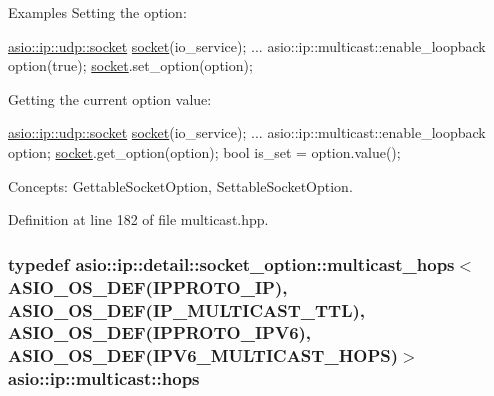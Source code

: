 \begin{DoxyParagraph}{Examples}
Setting the option\+: 
\begin{DoxyCode}
\hyperlink{classasio_1_1basic__datagram__socket}{asio::ip::udp::socket} \hyperlink{namespacewebsocketpp_1_1transport_1_1asio_1_1socket_1_1error_a828ddaa5ed63a761e1b557465a35f05aa0c31b356014843e1d09514e794a539a7}{socket}(io\_service); 
...
asio::ip::multicast::enable\_loopback option(\textcolor{keyword}{true});
\hyperlink{namespacewebsocketpp_1_1transport_1_1asio_1_1socket_1_1error_a828ddaa5ed63a761e1b557465a35f05aa0c31b356014843e1d09514e794a539a7}{socket}.set\_option(option);
\end{DoxyCode}

\end{DoxyParagraph}
\begin{DoxyParagraph}{}
Getting the current option value\+: 
\begin{DoxyCode}
\hyperlink{classasio_1_1basic__datagram__socket}{asio::ip::udp::socket} \hyperlink{namespacewebsocketpp_1_1transport_1_1asio_1_1socket_1_1error_a828ddaa5ed63a761e1b557465a35f05aa0c31b356014843e1d09514e794a539a7}{socket}(io\_service); 
...
asio::ip::multicast::enable\_loopback option;
\hyperlink{namespacewebsocketpp_1_1transport_1_1asio_1_1socket_1_1error_a828ddaa5ed63a761e1b557465a35f05aa0c31b356014843e1d09514e794a539a7}{socket}.get\_option(option);
\textcolor{keywordtype}{bool} is\_set = option.value();
\end{DoxyCode}

\end{DoxyParagraph}
\begin{DoxyParagraph}{Concepts\+:}
Gettable\+Socket\+Option, Settable\+Socket\+Option. 
\end{DoxyParagraph}


Definition at line 182 of file multicast.\+hpp.

\hypertarget{namespaceasio_1_1ip_1_1multicast_a9fb457c6f8978841b954fc752c04563f}{}
\subsubsection[{hops}]{\setlength{\rightskip}{0pt plus 5cm}typedef {\bf asio\+::ip\+::detail\+::socket\+\_\+option\+::multicast\+\_\+hops}$<$ {\bf A\+S\+I\+O\+\_\+\+O\+S\+\_\+\+D\+E\+F}(I\+P\+P\+R\+O\+T\+O\+\_\+\+I\+P), {\bf A\+S\+I\+O\+\_\+\+O\+S\+\_\+\+D\+E\+F}(I\+P\+\_\+\+M\+U\+L\+T\+I\+C\+A\+S\+T\+\_\+\+T\+T\+L), {\bf A\+S\+I\+O\+\_\+\+O\+S\+\_\+\+D\+E\+F}(I\+P\+P\+R\+O\+T\+O\+\_\+\+I\+P\+V6), {\bf A\+S\+I\+O\+\_\+\+O\+S\+\_\+\+D\+E\+F}(I\+P\+V6\+\_\+\+M\+U\+L\+T\+I\+C\+A\+S\+T\+\_\+\+H\+O\+P\+S)$>$ {\bf asio\+::ip\+::multicast\+::hops}}\label{namespaceasio_1_1ip_1_1multicast_a9fb457c6f8978841b954fc752c04563f}


